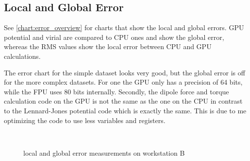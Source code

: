 \subsection{Local and Global Error}
See \autoref{chart:error_overview} for charts that show the local and global errors. GPU potential and virial are compared to CPU ones and show the global error, whereas the RMS values show the local error between CPU and GPU calculations.

The error chart for the simple  dataset looks very good, but the global error is off for the more complex datasets.
For one the GPU only has a precision of 64 bits, while the FPU uses 80 bits internally.
Secondly, the dipole force and torque calculation code on the GPU is not the same as the one on the CPU in contrast to the Lennard-Jones potential code which is exactly the same.
This is due to me optimizing the code to use less variables and registers.

\begin{figure}
\centering
{}
\\
\caption{local and global error measurements on workstation B}
\label{chart:error_overview}
\end{figure}